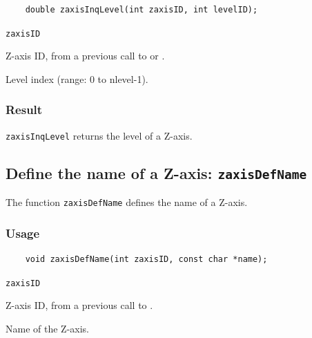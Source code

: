 \begin{verbatim}
    double zaxisInqLevel(int zaxisID, int levelID);
\end{verbatim}

\hspace*{4mm}\begin{minipage}[]{15cm}
\begin{deflist}{\texttt{zaxisID}\ }
\item[\texttt{zaxisID}]
Z-axis ID, from a previous call to {} or {}.
\item[\texttt{levelID}]
Level index (range: 0 to nlevel-1).

\end{deflist}
\end{minipage}

\subsubsection*{Result}

{\texttt{zaxisInqLevel}} returns the level of a Z-axis.


\subsection{Define the name of a Z-axis: \texttt{zaxisDefName}}
\label{zaxisDefName}

The function {\texttt{zaxisDefName}} defines the name of a Z-axis.

\subsubsection*{Usage}

\begin{verbatim}
    void zaxisDefName(int zaxisID, const char *name);
\end{verbatim}

\hspace*{4mm}\begin{minipage}[]{15cm}
\begin{deflist}{\texttt{zaxisID}\ }
\item[\texttt{zaxisID}]
Z-axis ID, from a previous call to {}.
\item[\texttt{name}]
Name of the Z-axis.

\end{deflist}
\end{minipage}


